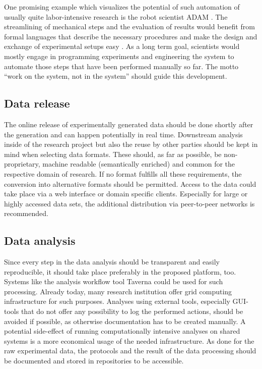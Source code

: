 \documentclass{article}
\begin{document}
One promising example which visualizes the potential of such
automation of usually quite labor-intensive research is the robot
scientist ADAM \cite{Ross}. The streamlining of mechanical steps and
the evaluation of results would benefit from formal languages that
describe the necessary procedures and make the design and exchange of
experimental setups easy \cite{Soldatova}. As a long term goal, scientists
would mostly engage in programming experiments and engineering the
system to automate those steps that have been performed manually so
far. The motto ``work on the system, not in the system'' should guide
this development.

\subsection{Data release}

The online release of experimentally generated data should be done
shortly after the generation and can happen potentially in real
time. Downstream analysis inside of the research project but also the
reuse by other parties should be kept in mind when selecting data
formats. These should, as far as possible, be non-proprietary, machine
readable (semantically enriched) and common for the respective domain
of research. If no format fulfills all these requirements, the
conversion into alternative formats should be permitted. Access to the
data could take place via a web interface or domain specific
clients. Especially for large or highly accessed data sets, the
additional distribution via peer-to-peer networks is recommended.

\subsection{Data analysis}

Since every step in the data analysis should be transparent and easily
reproducible, it should take place preferably in the proposed
platform, too. Systems like the analysis workflow tool Taverna
\cite{Hull} could be used for such processing. Already today, many
research institution offer grid computing infrastructure for such
purposes. Analyses using external tools, especially GUI-tools that do
not offer any possibility to log the performed actions, should be
avoided if possible, as otherwise documentation has to be created
manually. A potential side-effect of running computationally intensive
analyses on shared systems is a more economical usage of the needed
infrastructure. As done for the raw experimental data, the protocols
and the result of the data processing should be documented and stored
in repositories to be accessible.
\end{document}
